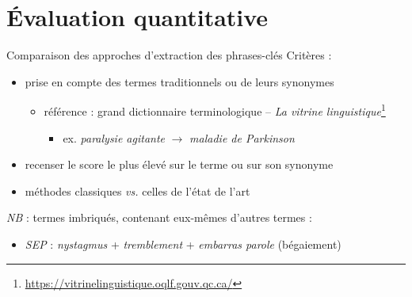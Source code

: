 \documentclass[xcolor={table,usenames,dvipsnames}]{beamer}
\let\olditem\item
\renewcommand{\item}{%
\olditem\vspace{0pt}}
\begin{document}
\section[Évaluation quantitative]{Évaluation quantitative}
\begin{frame}{Comparaison des approches d'extraction des phrases-clés}
	Critères :
	\begin{itemize}
		\item prise en compte des termes traditionnels ou de leurs synonymes
		\begin{itemize}
			\item référence : grand dictionnaire terminologique -- \textit{La vitrine linguistique}\footnote{\url{https://vitrinelinguistique.oqlf.gouv.qc.ca/}}
				\begin{itemize}
					\item ex. \textit{paralysie agitante} $\rightarrow$ \textit{maladie de Parkinson}
				\end{itemize}
		\end{itemize}
					\item recenser le score le plus élevé sur le terme ou sur son synonyme
					\item méthodes classiques \textit{vs.} celles de l'état de l'art
	\end{itemize}
	
	\textit{NB} : termes \og{}imbriqués\fg{}, contenant eux-mêmes d'autres termes :
	\begin{itemize}
		\item \textit{SEP} : \textit{nystagmus} + \textit{tremblement} + \textit{embarras parole} (bégaiement)
	\end{itemize}
	\end{frame}
	
\end{document}
